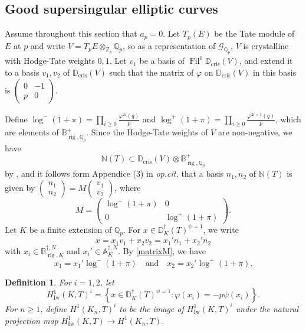 \documentclass{amsart}
\newcommand{\QQ}{\mathbb Q}
\newcommand{\ZZ}{\mathbb Z}
\newcommand{\BB}{\mathbb B}
\newcommand{\DD}{\mathbb D}
\renewcommand{\AA}{\mathbb A}
\newcommand{\NN}{\mathbb N}
\DeclareMathOperator{\Iw}{Iw}
\DeclareMathOperator{\cris}{cris}
\DeclareMathOperator{\rig}{rig}
\DeclareMathOperator{\Fil}{Fil}
\newcommand{\Qp}{\QQ_p}
\newcommand{\Zp}{\ZZ_p}
\newcommand{\calG}{\mathcal{G}}
\newcommand{\vp}{\varphi}
\newtheorem{definition}[theorem]{Definition}
\begin{document}
 \subsection{Good supersingular elliptic curves}\label{supersingular}
 
  Assume throughout this section that $a_p=0$. Let $T_p(E)$ be the Tate module of $E$ at $p$ and write $V=T_pE\otimes_{\Zp}\Qp$, so as a representation of $\calG_{\Qp}$, $V$ is crystalline with Hodge-Tate weights $0,1$. Let $v_1$ be a basis of $\Fil^0\DD_{\cris}(V)$, and extend it to a basis $v_1,v_2$ of $\DD_{\cris}(V)$ such that the matrix of $\vp$ on $\DD_{\cris}(V)$ in this basis is $\begin{pmatrix} 0 & -1 \\ p & 0\end{pmatrix}$. 

  Define $\log^-(1+\pi)=\prod_{i\geq 0}\frac{\vp^{2i}(q)}{p}$ and $\log^+(1+\pi)=\prod_{i\geq 0}\frac{\vp^{2i+1}(q)}{p}$, which are elements of $\BB^+_{\rig,\Qp}$. Since the Hodge-Tate weights of $V$ are non-negative, we have 
  \[ \NN(T)\subset \DD_{\cris}(V)\otimes\BB^+_{\rig,\Qp}\]
  by \cite[Proposition II.2.1]{berger03}, and it follows form Appendice (3) in {\em op.cit.} that a basis $n_1,n_2$ of $\NN(T)$ is given by $\begin{pmatrix} n_1 \\ n_2\end{pmatrix} = M\begin{pmatrix} v_1 \\ v_2\end{pmatrix}$, where 
  \begin{equation} M= \begin{pmatrix} \log^-(1+\pi) & 0 \\ 0 & \log^+(1+\pi) \end{pmatrix}.\label{matrixM}\end{equation}
  Let $K$ be a finite extension of $\Qp$. For $x\in \DD^\dagger_K(T)^{\psi=1}$, we write 
  \[x=x_1v_1+x_2v_2=x_1'n_1+x_2'n_2\] 
  with $x_i\in\BB^{\dagger,N}_{\rig,K}$ and $x_i'\in \AA^{\dagger,N}_{K}$. By \eqref{matrixM}, we have
  \begin{equation}\label{basechange}
   x_1=x_1'\log^-(1+\pi)\quad\text{and}\quad x_2=x_2'\log^+(1+\pi).
  \end{equation}


  \begin{definition}
   For $i=1,2$, let 
   \[ H^1_{\Iw}(K,T)^i=\left\{x\in\DD^\dagger_K(T)^{\psi=1}:\vp(x_i)=-p\psi(x_i)\right\}.\]
   For $n\geq 1$, define $H^1(K_n,T)^i$ to be the image of $H^1_{\Iw}(K,T)^i$ under the natural projection map $H^1_{\Iw}(K,T)\rightarrow H^1(K_n,T)$. 
  \end{definition}
  
\end{document}
